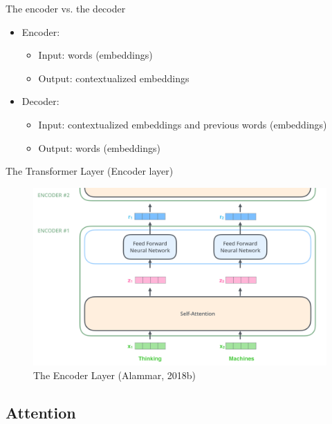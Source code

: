 \documentclass[10pt]{beamer}
\begin{document}
\begin{frame}{The encoder vs. the decoder}

\begin{itemize}
\item Encoder:
\begin{itemize}
\item Input: words (embeddings)
\item Output: contextualized embeddings
\end{itemize}
\item Decoder:
\begin{itemize}
\item Input: contextualized embeddings {\color{uured} and previous words} (embeddings)
\item Output: words (embeddings)
\end{itemize}
\end{itemize}
\end{frame}



\begin{frame}{The Transformer Layer (Encoder layer)}

\begin{figure}[h]
\centering
\includegraphics[width=1\textwidth]{fig/alammar_encoder_with_tensors_2.png}
\caption{The Encoder Layer (Alammar, 2018b)}
\end{figure}

\end{frame}


\subsection{Attention}
\end{document}
